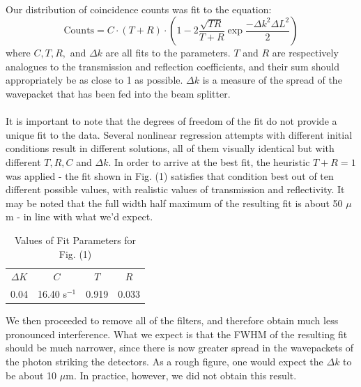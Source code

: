 \documentclass[10pt,a4paper]{article}
\begin{document}
\\
Our distribution of coincidence counts was fit to the equation:
\begin{equation}
\mathrm{Counts} = C\cdot\left(T + R \right)\cdot\left(1 - 2\dfrac{\sqrt{TR}}{T+R}\exp{\dfrac{-\Delta k^{2} \Delta L^{2}}{2}}\right)
\end{equation}
where $C,T,R,$ and $\Delta k$ are all fits to the parameters. $T$ and $R$ are respectively analogues to the transmission and reflection coefficients, and their sum should appropriately be as close to 1 as possible. $\Delta k$ is a measure of the spread of the wavepacket that has been fed into the beam splitter.\\
\\
It is important to note that the degrees of freedom of the fit do not provide a unique fit to the data. Several nonlinear regression attempts with different initial conditions result in different solutions, all of them visually identical but with different $T,R,C$ and $\Delta k$. In order to arrive at the best fit, the heuristic $T + R = 1$ was applied - the fit shown in Fig. (1) satisfies that condition best out of ten different possible values, with realistic values of transmission and reflectivity. It may be noted that the full width half maximum of the resulting fit is about 50 $\mu$m - in line with what we'd expect.
\begin{table}[H]
\centering
\begin{tabular}{|c|c|c|c|}
\hline
$\Delta K$ & $C$ & $T$ & $R$\\
0.04 & 16.40 s$^{-1}$ & 0.919 & 0.033\\
\hline
\end{tabular}
\caption{Values of Fit Parameters for Fig. (1)}
\end{table}
We then proceeded to remove all of the filters, and therefore obtain much less pronounced interference. What we expect is that the FWHM of the resulting fit should be much narrower, since there is now greater spread in the wavepackets of the photon striking the detectors. As a rough figure, one would expect the $\Delta k$ to be about 10 $\mu$m. In practice, however, we did not obtain this result.
\end{document}
